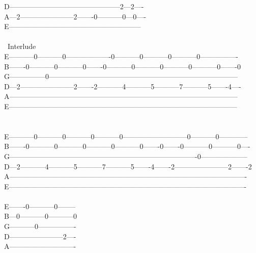 {D-----------------------------------------------2---2----\\
A---2-----------------------2-------0-----------0---0----\\
E--------------------------------------------------------\\
\\
\lbrack\ Interlude\rbrack\\
E-----------0-----------0-------------------0-----------0-----------0-----------0----------------\\
B-------0-----------0-----------0-------0-----------0-----------0-----------0-----------0-------0\\
G---------------0--------------------------------------------------------------------------------\\
D---2-----------------------2-------2-----------4-----------5-----------7-----------5-------4----\\
A------------------------------------------------------------------------------------------------\\
E------------------------------------------------------------------------------------------------\\
\\
\\
E-----------0-----------0-----------0-----------0---------------------------0-----------0------------\\
B-------0-----------0-----------0-----------0-----------0-------0-------0-----------0-----------0----\\
G-------------------------------------------------------------------------------0--------------------\\
D---2-----------4-----------5-----------7-----------5-------4-------2-----------------------2-------2\\
A----------------------------------------------------------------------------------------------------\\
E----------------------------------------------------------------------------------------------------\\
\ \ \ \ \ \ \ \ \ \ \ \ \ \ \ \ \ \ \ \ \ \ \ \ \\
E-------0-----------0--------\\
B---0-----------0-----------0\\
G-----------0----------------\\
D-----------------------2----\\
A----------------------------\\
}
